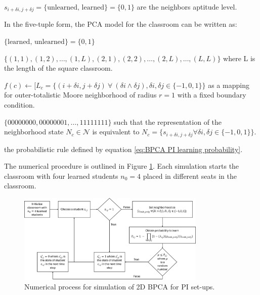 $s_{i+\delta i, j+\delta j} = \lbrace\text{unlearned, learned}\rbrace=\lbrace 0,1 \rbrace$ are the neighbors aptitude level.

\newpage
In the five-tuple form, the PCA model for the classroom can be written as:

\begin{CAdef}
\itemS $\lbrace \text{learned, unlearned} \rbrace = \lbrace 0, 1 \rbrace$

\itemC $\lbrace (1,1), (1,2), \dots, (1,L), (2, 1), (2,2), \dots, (2,L), \dots, (L,L)\rbrace$ where L is the length of the square classroom.

\itemL $f(c) \leftarrow \lbrack L_c = \lbrace (i+\delta i,j+\delta j) ~\forall~ (\delta i \land \delta j),  \delta i, \delta j \in \lbrace -1,0,1 \rbrace \rbrace $ as a mapping for outer-totalistic Moore neighborhood of radius $r=1$ with a fixed boundary condition.

\itemN $\lbrace 00000000, 00000001, \dots, 11111111 \rbrace$ such that the representation of the neighborhood state $N_c \in \mathcal{N}$ is equivalent to $N_c = \lbrace s_{i+\delta i, j+\delta j} \forall \delta i, \delta j \in \lbrace -1,0,1 \rbrace \rbrace$.

\itemR the probabilistic rule defined by equation \ref{eq:BPCA PI learning probability}.
\end{CAdef}

The numerical procedure is outlined in Figure \ref{fig:2DBPCA PI Flowchart}. Each simulation starts the classroom with four learned students $n_0 = 4$ placed in different seats in the classroom. 

\begin{figure}[h!]
    \centering
    \includegraphics[width=0.8\textwidth]{figures/2DBPCA PI Flowchart.png}
    \caption[Peer instruction flowchart]{Numerical process for simulation of 2D BPCA for PI set-ups.}
    \label{fig:2DBPCA PI Flowchart}
\end{figure}

